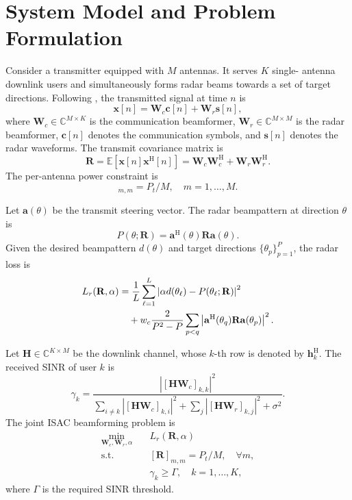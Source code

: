 \documentclass[10pt,journal]{IEEEtran}
\newcommand{\vect}[1]{\mathbf{#1}}
\newcommand{\mat}[1]{\mathbf{#1}}
\newcommand{\Herm}{\mathrm{H}}
\newcommand{\E}{\mathbb{E}}
\begin{document}
\section{System Model and Problem Formulation}
Consider a transmitter equipped with $M$ antennas. It serves $K$ single-
antenna downlink users and simultaneously forms radar beams towards a set
of target directions. Following \cite{liu2020joint}, the transmitted
signal at time $n$ is
\begin{equation}
    \vect{x}[n] = \mat{W}_{c}\vect{c}[n] + \mat{W}_{r}\vect{s}[n],
\end{equation}
where $\mat{W}_{c}\in\mathbb{C}^{M\times K}$ is the communication
beamformer, $\mat{W}_{r}\in\mathbb{C}^{M\times M}$ is the radar
beamformer, $\vect{c}[n]$ denotes the communication symbols, and
$\vect{s}[n]$ denotes the radar waveforms. The transmit covariance matrix
is
\begin{equation}
    \mat{R} = \E[\vect{x}[n]\vect{x}^{\Herm}[n]]
    = \mat{W}_{c}\mat{W}_{c}^{\Herm}
    + \mat{W}_{r}\mat{W}_{r}^{\Herm}.
\end{equation}
The per-antenna power constraint is
\begin{equation}
    [\mat{R}]_{m,m}=P_t/M,\quad m=1,\ldots,M.
\end{equation}

Let $\vect{a}(\theta)$ be the transmit steering vector. The radar
beampattern at direction $\theta$ is
\begin{equation}
    P(\theta;\mat{R})=\vect{a}^{\Herm}(\theta)\mat{R}\vect{a}(\theta).
\end{equation}
Given the desired beampattern $d(\theta)$ and target directions
$\{\theta_p\}_{p=1}^{P}$, the radar loss is
\begin{align}
    L_r(\mat{R},\alpha)
    &= \frac{1}{L}\sum_{\ell=1}^{L}
    \left|\alpha d(\theta_\ell)-P(\theta_\ell;\mat{R})\right|^2  \notag\\
    &\quad + w_c\frac{2}{P^2-P}
    \sum_{p<q}\left|\vect{a}^{\Herm}(\theta_q)
    \mat{R}\vect{a}(\theta_p)\right|^2 .
\end{align}

Let $\mat{H}\in\mathbb{C}^{K\times M}$ be the downlink channel, whose
$k$-th row is denoted by $\vect{h}_k^{\Herm}$. The received SINR of user
$k$ is
\begin{equation}
    \gamma_k =
    \frac{|[\mat{H}\mat{W}_c]_{k,k}|^2}
    {\sum_{i\ne k}|[\mat{H}\mat{W}_c]_{k,i}|^2
    +\sum_{j}|[\mat{H}\mat{W}_r]_{k,j}|^2+\sigma^2 } .
\end{equation}
The joint ISAC beamforming problem is
\begin{subequations}
\begin{align}
    \min_{\mat{W}_c,\mat{W}_r,\alpha}\quad
    & L_r(\mat{R},\alpha)\\
    \mathrm{s.t.}\quad
    & [\mat{R}]_{m,m}=P_t/M,\quad \forall m,\\
    & \gamma_k\ge \Gamma,\quad k=1,\ldots,K,
\end{align}
\end{subequations}
where $\Gamma$ is the required SINR threshold.
\end{document}

